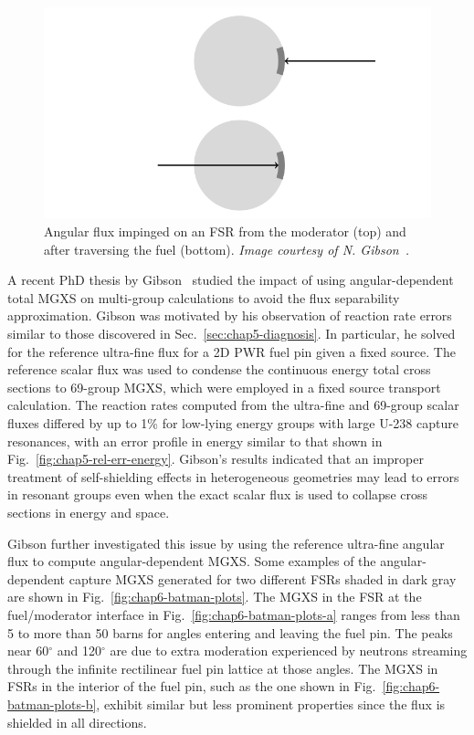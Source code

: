 \begin{figure}[h]
  \centering
  \includegraphics[width=\linewidth]{figures/sph/incoming-outgoing}
  \caption[Angular flux impinged on an FSR]{Angular flux impinged on an FSR from the moderator (top) and after traversing the fuel (bottom). \textit{Image courtesy of N. Gibson~\cite{gibson2016thesis}.}}
\label{fig:chap6-incoming-outgoing}
\end{figure}

A recent PhD thesis by Gibson~\cite{gibson2016thesis} studied the impact of using angular-dependent total \ac{MGXS} on multi-group calculations to avoid the flux separability approximation. Gibson was motivated by his observation of reaction rate errors similar to those discovered in Sec.~\ref{sec:chap5-diagnosis}. In particular, he solved for the reference ultra-fine flux for a 2D \ac{PWR} fuel pin given a fixed source. The reference scalar flux was used to condense the continuous energy total cross sections to 69-group \ac{MGXS}, which were employed in a fixed source transport calculation. The reaction rates computed from the ultra-fine and 69-group scalar fluxes differed by up to 1\% for low-lying energy groups with large U-238 capture resonances, with an error profile in energy similar to that shown in Fig.~\ref{fig:chap5-rel-err-energy}. Gibson's results indicated that an improper treatment of self-shielding effects in heterogeneous geometries may lead to errors in resonant groups even when the exact scalar flux is used to collapse cross sections in energy and space.

Gibson further investigated this issue by using the reference ultra-fine angular flux to compute angular-dependent \ac{MGXS}. Some examples of the angular-dependent capture \ac{MGXS} generated for two different \ac{FSR}s shaded in dark gray are shown in Fig.~\ref{fig:chap6-batman-plots}. The \ac{MGXS} in the \ac{FSR} at the fuel/moderator interface in Fig.~\ref{fig:chap6-batman-plots-a} ranges from less than 5 to more than 50 barns for angles entering and leaving the fuel pin. The peaks near 60$^{\circ}$ and 120$^{\circ}$ are due to extra moderation experienced by neutrons streaming through the infinite rectilinear fuel pin lattice at those angles. The \ac{MGXS} in \ac{FSR}s in the interior of the fuel pin, such as the one shown in Fig.~\ref{fig:chap6-batman-plots-b}, exhibit similar but less prominent properties since the flux is shielded in all directions.

